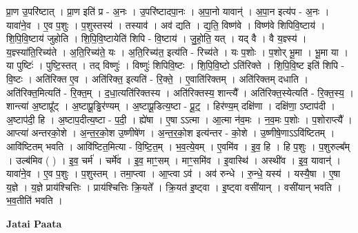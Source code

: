 \documentclass[17pt]{extarticle}
\begin{document}
प्रा॒ण उ॒परि॑ष्टात् । प्रा॒ण इति॑ प्र - अ॒नः । उ॒परि॑ष्टादपा॒नः । अ॒पा॒नो यावान्॑ । अ॒पा॒न इत्य॑प - अ॒नः । यावा॑ने॒व । ए॒व प॒शुः । प॒शुस्तस्य॑ । तस्याव॑ । अव॑ द्यति । द्य॒ति॒ विष्ण॑वे । विष्ण॑वे शिपिवि॒ष्टाय॑ । शि॒पि॒वि॒ष्टाय॑ जुहोति । शि॒पि॒वि॒ष्टायेति॑ शिपि - वि॒ष्टाय॑ । जु॒हो॒ति॒ यत् । यद् वै । वै य॒ज्ञ्स्य॑ । य॒ज्ञ्स्या॑ति॒रिच्य॑ते । अ॒ति॒रिच्य॑ते॒ यः । अ॒ति॒रिच्य॑त॒ इत्य॑ति - रिच्य॑ते । यः प॒शोः । प॒शोर् भू॒मा । भू॒मा या । या पुष्टिः॑ । पुष्टि॒स्तत् । तद् विष्णुः॑ । विष्णुः॑ शिपिवि॒ष्टः । शि॒पि॒वि॒ष्टो ऽति॑रिक्ते । शि॒पि॒वि॒ष्ट इति॑ शिपि - वि॒ष्टः । अति॑रिक्त ए॒व । अति॑रिक्त॒ इत्यति॑ - रि॒क्ते॒ । ए॒वाति॑रिक्तम् । अति॑रिक्तम् दधाति । अति॑रिक्त॒मित्यति॑ - रि॒क्त॒म् । द॒धा॒त्यति॑रिक्तस्य । अति॑रिक्तस्य॒ शान्त्यै᳚ । अति॑रिक्त॒स्येत्यति॑ - रि॒क्त॒स्य॒ । शान्त्या॑ अ॒ष्टाप्रू᳚ट् । अ॒ष्टाप्रू॒ड्ढिर॑ण्यम् । अ॒ष्टाप्रू॒डित्य॒ष्टा - प्रू॒ट्॒ । हिर॑ण्य॒म् दक्षि॑णा । दक्षि॑णा॒ ऽष्टाप॑दी । अ॒ष्टाप॑दी॒ हि । अ॒ष्टाप॒दीत्य॒ष्टा - प॒दी॒ । ह्ये॑षा । ए॒षा ऽऽत्मा । आ॒त्मा न॑व॒मः । न॒व॒मः प॒शोः । प॒शोराप्त्यै᳚ । आप्त्या॑ अन्तरको॒शे । अ॒न्त॒र॒को॒श उ॒ष्णीषे॑ण । अ॒न्त॒र॒को॒श इत्य॑न्तर - को॒शे । उ॒ष्णीषे॒णाऽऽवि॑ष्टितम् । आवि॑ष्टितम् भवति । आवि॑ष्टित॒मित्या - वि॒ष्टि॒त॒म् । भ॒व॒त्ये॒वम् । ए॒वमि॑व । इ॒व॒ हि । हि प॒शुः । प॒शुरुल्ब᳚म् । उल्ब॑मिव ( ) । इ॒व॒ चर्म॑ । चर्मे॑व । इ॒व॒ माꣳ॒॒सम् । माꣳ॒॒समि॑व । इ॒वास्थि॑ । अस्थी॑व । इ॒व॒ यावान्॑ । यावा॑ने॒व । ए॒व प॒शुः । प॒शुस्तम् । तमा॒प्त्वा । आ॒प्त्वा ऽव॑ । अव॑ रुन्धे । रु॒न्धे॒ यस्य॑ । यस्यै॒षा । ए॒षा य॒ज्ञे । य॒ज्ञे प्राय॑श्चित्तिः । प्राय॑श्चित्तिः क्रि॒यते᳚ । क्रि॒यत॑ इ॒ष्ट्वा । इ॒ष्ट्वा वसी॑यान् । वसी॑यान् भवति । भ॒व॒तीति॑ भवति । \newline

\textbf{Jatai Paata} \newline
\end{document}
